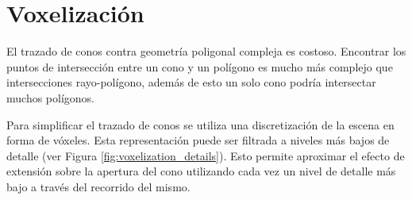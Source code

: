\section{Voxelización} %
\label{sec:voxelizacion}
El trazado de conos contra geometría poligonal compleja es costoso. Encontrar los puntos de intersección entre un cono y un polígono es mucho más complejo que intersecciones rayo-polígono, además de esto un solo cono podría intersectar muchos polígonos.

Para simplificar el trazado de conos se utiliza una discretización de la escena en forma de vóxeles. Esta representación puede ser filtrada a niveles más bajos de detalle (ver Figura \ref{fig:voxelization_details}). Esto permite aproximar el efecto de extensión sobre la apertura del cono utilizando cada vez un nivel de detalle más bajo a través del recorrido del mismo.

